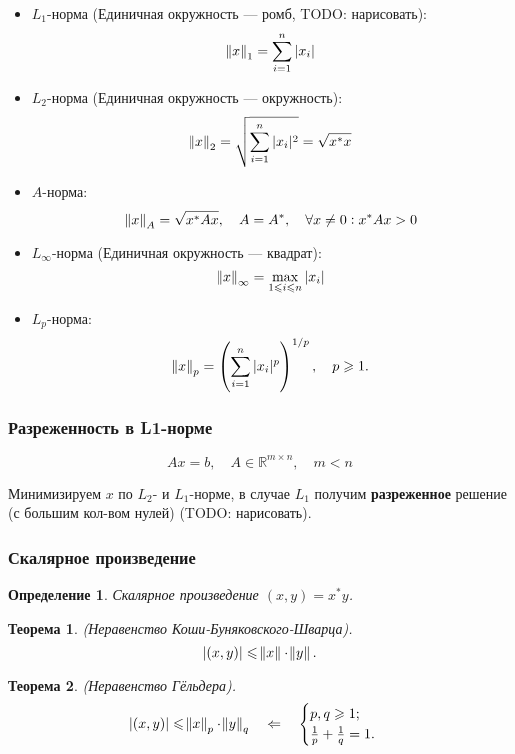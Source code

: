 \documentclass[a4paper, 12pt]{article}
\renewcommand{\le}{\ensuremath{\leqslant}}
\renewcommand{\ge}{\ensuremath{\geqslant}}
\newcommand{\R}{\mathbb{R}}
\newtheorem{theorem}{Теорема}[section]
\newtheorem{definition}{Определение}[section]
\begin{document}
\begin{itemize}
    \item $L_1$-норма (Единичная окружность --- ромб, TODO: нарисовать):
        \[
            \norm{x}_1 = \sum_{i = 1}^n |x_i|
        \]

    \item $L_2$-норма (Единичная окружность --- окружность):
        \[
            \norm{x}_2 = \sqrt{\sum_{i = 1}^n |x_i|^2} = \sqrt{x^* x}
        \]

    \item $A$-норма:
        \[
            \norm{x}_A = \sqrt{x^* A x}, \quad A = A^*,
            \quad \forall x \ne 0: x^* A x > 0
        \]

    \item $L_\infty$-норма (Единичная окружность --- квадрат):
        \[
            \norm{x}_\infty = \max_{1 \le i \le n} |x_i|
        \]

    \item $L_p$-норма:
        \[
            \norm{x}_p = \left( \sum_{i = 1}^n |x_i|^p \right)^{1/p},
            \quad p \ge 1.
        \]
\end{itemize}

\subsubsection{Разреженность в L1-норме}

\[
    A x = b, \quad A \in \R^{m \times n}, \quad m < n
\]

Минимизируем $x$ по $L_2$- и $L_1$-норме, в случае $L_1$ получим
\textbf{разреженное} решение (с большим кол-вом нулей) (TODO: нарисовать).

\subsubsection{Скалярное произведение}

\begin{definition}
    Скалярное произведение $(x, y) = x^* y$.
\end{definition}

\begin{theorem} (Неравенство Коши-Буняковского-Шварца).
    \[
        |(x, y)| \le \norm{x} \cdot \norm{y}.
    \]
\end{theorem}

\begin{theorem} (Неравенство Гёльдера).
    \[
        |(x, y)| \le \norm{x}_p \cdot \norm{y}_q \quad \Leftarrow \quad
        \begin{cases}
            p, q \ge 1; \\
            \frac{1}{p} + \frac{1}{q} = 1.
        \end{cases}
    \]
\end{theorem}
\end{document}
